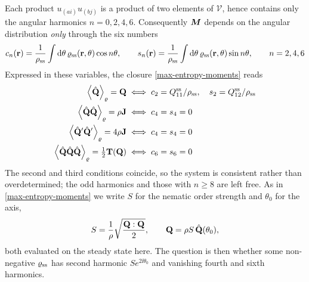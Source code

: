 \documentclass[a5paper]{article}
\begin{document}
Each product $u_{(ai)} u_{(bj)}$ is a product of two elements of $\mathcal{V}$, hence contains only the angular harmonics $n = 0,2,4,6$. Consequently $\bs M$ depends on the angular distribution \emph{only} through the six numbers
\begin{align}
    \label{harmonic-moments}
    c_n(\r) = \frac{1}{\rho_\ss}\int\d\theta\, \varrho_\ss(\r,\theta) \cos n\theta,
    \qquad
    s_n(\r) = \frac{1}{\rho_\ss}\int\d\theta\, \varrho_\ss(\r,\theta) \sin n\theta,
    \qquad n = 2,4,6
\end{align}
Expressed in these variables, the closure \eqref{max-entropy-moments} reads
\begin{subequations}
    \label{closure-harmonics}
\begin{align} 
    \la\hat\Q\ra_\varrho = \Q
    &\iff c_2 = Q^\ss_{11}/\rho_\ss, \quad s_2 = Q^\ss_{12}/\rho_\ss
    \\
    \la\hat\Q\hat\Q\ra_\varrho = \rho\J
    &\iff c_4 = s_4 = 0
    \\
    \la\hat\Q'\hat\Q'\ra_\varrho = 4\rho\J
    &\iff c_4 = s_4 = 0
    \\
    \la\hat\Q\hat\Q\hat\Q\ra_\varrho = \tfrac{1}{2}\bT(\Q)
    &\iff c_6 = s_6 = 0
\end{align}
\end{subequations}
The second and third conditions coincide, so the system is consistent rather than overdetermined; the odd harmonics and those with $n\ge 8$ are left free. As in \cref{max-entropy-moments} we write $S$ for the nematic order strength and $\theta_0$ for the axis,
\begin{align}
    \label{S-definition}
    S = \frac{1}{\rho}\sqrt{\frac{\Q:\Q}{2}},
    \qquad
    \Q = \rho S\, \hat\Q(\theta_0),
\end{align}
both evaluated on the steady state here. The question is then whether some non-negative $\varrho_\ss$ has second harmonic $S e^{2\ii\theta_0}$ and vanishing fourth and sixth harmonics.
\end{document}
